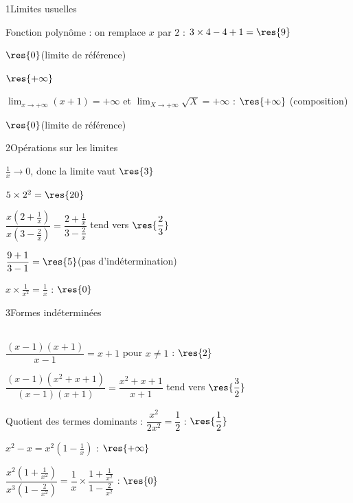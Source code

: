 

\begin{deuxcolonnes}

\begin{corrige}{1}{Limites usuelles}
\begin{questions}
  \item Fonction polynôme : on remplace $x$ par $2$ : $3\times4-4+1=\res{9}$
  \item $\res{0}$\quad (limite de référence)
  \item $\res{+\infty}$
  \item $\lim_{x\to+\infty}(x+1)=+\infty$ et $\lim_{X\to+\infty}\sqrt{X}=+\infty$ : $\res{+\infty}$ (composition)
  \item $\res{0}$\quad (limite de référence)
\end{questions}
\end{corrige}

\begin{corrige}{2}{Opérations sur les limites}
\begin{questions}
  \item $\frac1x\to0$, donc la limite vaut $\res{3}$
  \item $5\times2^{2}=\res{20}$
  \item $\dfrac{x\left(2+\frac1x\right)}{x\left(3-\frac2x\right)}=\dfrac{2+\frac1x}{3-\frac2x}$ tend vers $\res{\dfrac23}$
  \item $\dfrac{9+1}{3-1}=\res{5}$\quad (pas d'indétermination)
  \item $x\times\frac{1}{x^{2}}=\frac1x$ : $\res{0}$
\end{questions}
\end{corrige}

\begin{corrige}{3}{Formes indéterminées}
\begin{questions}
  \item {}\\
    $\dfrac{(x-1)(x+1)}{x-1}=x+1$ pour $x\neq1$ : $\res{2}$
  \item $\dfrac{(x-1)(x^{2}+x+1)}{(x-1)(x+1)}=\dfrac{x^{2}+x+1}{x+1}$ tend vers $\res{\dfrac32}$
  \item Quotient des termes dominants : $\dfrac{x^{2}}{2x^{2}}=\dfrac12$ : $\res{\dfrac12}$
  \item $x^{2}-x=x^{2}\left(1-\frac1x\right)$ : $\res{+\infty}$
  \item $\dfrac{x^{2}\left(1+\frac{1}{x^{2}}\right)}{x^{3}\left(1-\frac{2}{x^{2}}\right)}=\dfrac1x\times\dfrac{1+\frac{1}{x^{2}}}{1-\frac{2}{x^{2}}}$ : $\res{0}$
\end{questions}
\end{corrige}


\end{deuxcolonnes}
